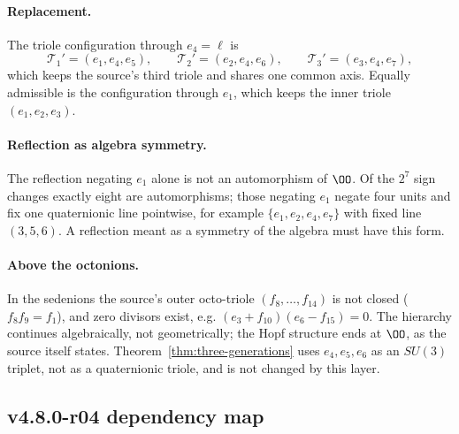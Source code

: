 \paragraph{Replacement.}
The triole configuration through \(e_4=\ell\) is
\[
\mathcal T_1'=(e_1,e_4,e_5),\qquad \mathcal T_2'=(e_2,e_4,e_6),\qquad
\mathcal T_3'=(e_3,e_4,e_7),
\]
which keeps the source's third triole and shares one common axis.  Equally admissible is the
configuration through \(e_1\), which keeps the inner triole \((e_1,e_2,e_3)\).

\paragraph{Reflection as algebra symmetry.}
The reflection negating \(e_1\) alone is not an automorphism of \(\OO\).  Of the
\(2^7\) sign changes exactly eight are automorphisms; those negating \(e_1\) negate four units
and fix one quaternionic line pointwise, for example \(\{e_1,e_2,e_4,e_7\}\) with fixed line
\((3,5,6)\).  A reflection meant as a symmetry of the algebra must have this form.

\paragraph{Above the octonions.}
In the sedenions the source's outer octo-triole \((f_8,\dots,f_{14})\) is not closed
(\(f_8f_9=f_1\)), and zero divisors exist, e.g. \((e_3+f_{10})(e_6-f_{15})=0\).  The hierarchy
continues algebraically, not geometrically; the Hopf structure ends at \(\OO\), as the source
itself states.  Theorem~\ref{thm:three-generations} uses \(e_4,e_5,e_6\) as an \(SU(3)\)
triplet, not as a quaternionic triole, and is not changed by this layer.

\subsection*{v4.8.0-r04 dependency map}
\label{subsec:v480-r04-dependency-map}

